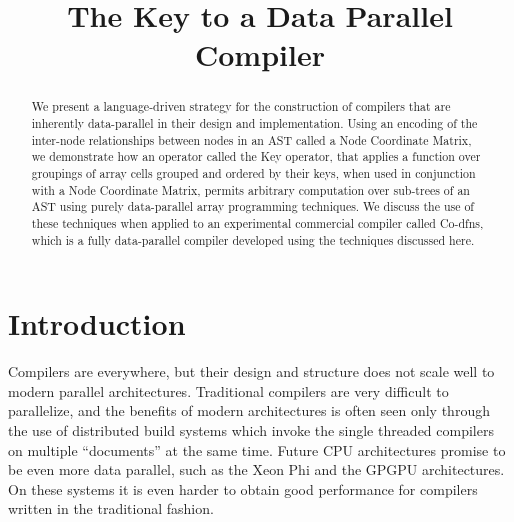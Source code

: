 \documentclass[numbers,preprint]{sigplanconf}
\begin{document}
\title{The Key to a Data Parallel Compiler}



\maketitle
\begin{abstract}
We present a language-driven strategy for the construction of 
compilers that are inherently data-parallel in their design and 
implementation. Using an encoding of the inter-node relationships 
between nodes in an AST called a Node Coordinate Matrix, we demonstrate how 
an operator called the Key operator, that applies a function over groupings 
of array cells grouped and ordered by their keys, when used in conjunction 
with a Node Coordinate Matrix, permits arbitrary computation over sub-trees 
of an AST using purely data-parallel array programming techniques. We discuss 
the use of these techniques when applied to an experimental commercial 
compiler called Co-dfns, which is a fully data-parallel compiler developed 
using the techniques discussed here.
\end{abstract}

% 
% 
% 

\section{Introduction}

Compilers are everywhere, but their design and structure does not scale
well to modern parallel architectures. Traditional compilers are very
difficult to parallelize, and the benefits of modern architectures is
often seen only through the use of distributed build systems which
invoke the single threaded compilers on multiple ``documents'' at
the same time. Future CPU architectures promise to be even more data
parallel, such as the Xeon Phi and the GPGPU architectures. On these
systems it is even harder to obtain good performance for compilers
written in the traditional fashion.
\end{document}
